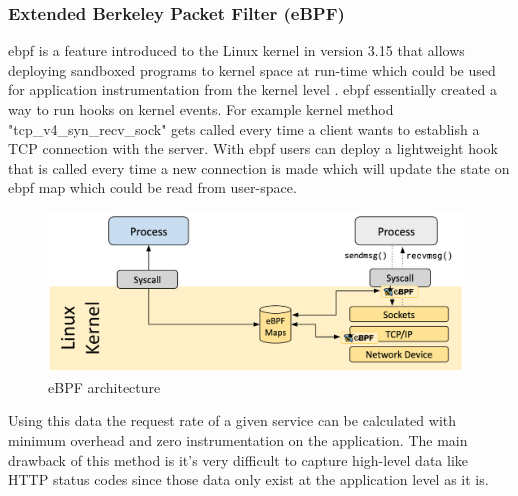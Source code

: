 \subsubsection{Extended Berkeley Packet Filter (eBPF)}

\ac{ebpf} is a feature introduced to the Linux kernel in version 3.15 that allows deploying sandboxed programs to kernel space at run-time which could be used for application instrumentation from the kernel level \citep{LKMLIngo52:online}. \ac{ebpf} essentially created a way to run hooks on kernel events. For example kernel method "tcp\_v4\_syn\_recv\_sock" gets called every time a client wants to establish a TCP connection with the server. With \ac{ebpf} users can deploy a lightweight hook that is called every time a new connection is made which will update the state on \ac{ebpf} map which could be read from user-space. 

\begin{figure}[H]
    \includegraphics[width=11cm]{assets/literature-review/ebpf-architecture.png}
    \caption{eBPF architecture \citep{WhatiseB46:online}}
    \label{fig:ebpf-architecture}
\end{figure}

Using this data the request rate of a given service can be calculated with minimum overhead and zero instrumentation on the application. The main drawback of this method is it's very difficult to capture high-level data like HTTP status codes since those data only exist at the application level as it is.

